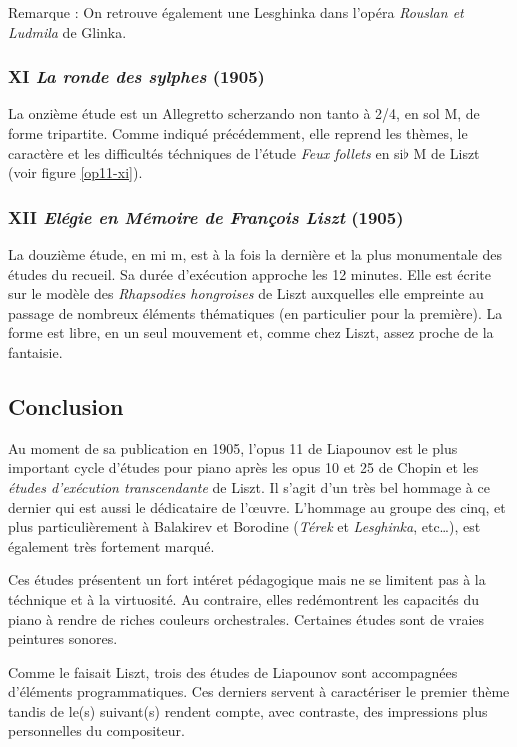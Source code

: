Remarque : On retrouve également une Lesghinka dans l'opéra \emph{Rouslan et Ludmila} de Glinka.

\newpage

\subsubsection{XI \emph{La ronde des sylphes} (1905)}

La onzième étude est un Allegretto scherzando non tanto à 2/4, en sol M, de forme tripartite. Comme indiqué précédemment, elle reprend les thèmes, le caractère et les difficultés téchniques de l'étude \emph{Feux follets} en si$\flat$ M de Liszt (voir figure \ref{op11-xi}).

\subsubsection{XII \emph{Elégie en Mémoire de François Liszt} (1905)}

La douzième étude, en mi m, est à la fois la dernière et la plus monumentale des études du recueil. Sa durée d'exécution approche les 12 minutes. Elle est écrite sur le modèle des \emph{Rhapsodies hongroises} de Liszt auxquelles elle empreinte au passage de nombreux éléments thématiques (en particulier pour la première). La forme est libre, en un seul mouvement et, comme chez Liszt, assez proche de la fantaisie.

\subsection{Conclusion}

Au moment de sa publication en 1905, l'opus 11 de Liapounov est le plus important cycle d'études pour piano après les opus 10 et 25 de Chopin et les \emph{études d'exécution transcendante} de Liszt. Il s'agit d'un très bel hommage à ce dernier qui est aussi le dédicataire de l'œuvre. L'hommage au groupe des cinq, et plus particulièrement à Balakirev et Borodine (\emph{Térek} et \emph{Lesghinka}, etc\dots), est également très fortement marqué.

Ces études présentent un fort intéret pédagogique mais ne se limitent pas à la téchnique et à la virtuosité. Au contraire, elles redémontrent les capacités du piano à rendre de riches couleurs orchestrales. Certaines études sont de vraies peintures sonores.

Comme le faisait Liszt, trois des études de Liapounov sont accompagnées d'éléments programmatiques. Ces derniers servent à caractériser le premier thème tandis de le(s) suivant(s) rendent compte, avec contraste, des impressions plus personnelles du compositeur.

